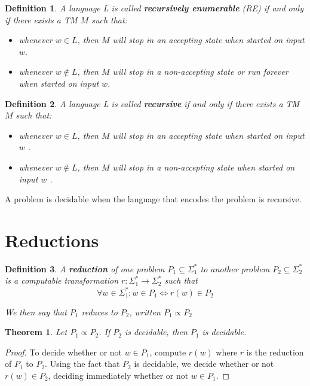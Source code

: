 \documentclass[a4paper,11pt]{report}
\newtheorem*{mydef}{Definition}
\newtheorem{theorem}{Theorem}
\begin{document}
\begin{mydef}
  A language L is called \textbf{recursively enumerable} (RE) if and only if
  there exists a TM $M$ such that:
  \begin{itemize}
  \item whenever $w \in L$, then $M$ will stop in an accepting state when started on
    input $w$.
  \item whenever $w \not\in L$, then $M$ will stop in a non-accepting state or run
    forever when started on input $w$.
  \end{itemize}
\end{mydef}

\begin{mydef}
  A language L is called \textbf{recursive} if and only if there exists a TM $M$
  such that:
  \begin{itemize}
  \item whenever $w \in L$, then $M$ will stop in an accepting state when
    started on input $w$ .
  \item whenever $w \not\in L$, then $M$ will stop in a non-accepting state
    when started on input $w$ .
  \end{itemize}
\end{mydef}

A problem is decidable when the language that encodes the problem is recursive.

\section{Reductions}

\begin{mydef}
  A \textbf{reduction} of one problem $P_1 \subseteq \Sigma_1^*$ to another
  problem $P_2 \subseteq \Sigma_2^*$ is a computable transformation $r:
  \Sigma_1^* \rightarrow \Sigma_2^*$ such that
  \[
    \forall w \in \Sigma_1^* ; w \in P_1 \Longleftrightarrow r(w) \in P_2
  \]

  We then say that $P_1$ reduces to $P_2$, written $P_1 \varpropto P_2$
\end{mydef}

\begin{theorem}
  Let $P_1 \varpropto P_2$. If $P_2$ is decidable, then $P_1$ is decidable.
\end{theorem}

\begin{proof}
  To decide whether or not $w \in P_1$, compute $r(w)$ where $r$ is the reduction of
  $P_1$ to $P_2$. Using the fact that $P_2$ is decidable, we decide whether or not
  $r(w) \in P_2$, deciding immediately whether or not $w \in P_1$.
\end{proof}
\end{document}
